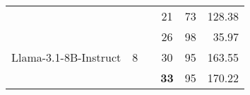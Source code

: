 \begin{table*}[t]
\begin{tabular}{llcccr}
  \midrule

     & & \stdUnconstrained{} & 21 & 73 & 128.38 \\
 & & \stdConstrained{} & 26 & 98 & 35.97  \\
 Llama-3.1-8B-Instruct & 8 & \cotUnconstrained{} & 30 & 95 & 163.55 \\
 & & \textbf{\Tool{}} & \textbf{33} & 95 & 170.22 \\


\bottomrule
    \end{tabular}
    \label{tab:gsm_symbolic_comparison_k_shot}
    \vspace{-.2in}
\end{table*}